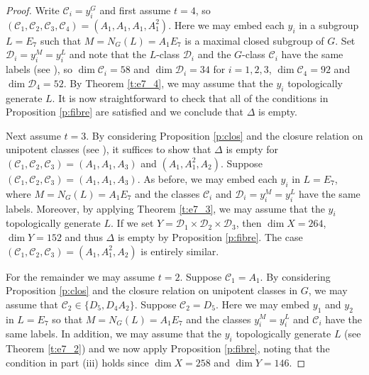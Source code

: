 \documentclass[twoside,a4paper,reqno,11pt]{amsart}
\newcommand{\<}{\langle}
\renewcommand{\>}{\rangle}
\renewcommand{\:}{\colon}
\theoremstyle{plain}
\theoremstyle{definition}
\begin{document}
\begin{proof}
Write $\mathcal{C}_i = y_i^G$ and first assume $t=4$, so $(\mathcal{C}_1, \mathcal{C}_2, \mathcal{C}_3, \mathcal{C}_4) = (A_1,A_1,A_1,A_1^2)$. Here we may embed each $y_i$ in a subgroup $L = E_7$ such that $M=N_G(L)=A_1E_7$ is a maximal closed subgroup of $G$. Set $\mathcal{D}_i = y_i^M = y_i^L$ and note that the $L$-class $\mathcal{D}_i$ and the $G$-class $\mathcal{C}_i$ have the same labels (see \cite[Section 4.14]{Law2}), so $\dim \mathcal{C}_i = 58$ and $\dim \mathcal{D}_i = 34$ for $i=1,2,3$, $\dim \mathcal{C}_4 = 92$ and $\dim \mathcal{D}_4 = 52$. By Theorem \ref{t:e7_4}, we may assume that the $y_i$ topologically generate $L$. It is now straightforward to check that all of the conditions in Proposition \ref{p:fibre} are satisfied and we conclude that $\Delta$ is empty.

Next assume $t=3$. By considering Proposition \ref{p:clos} and the closure relation on unipotent classes (see \cite{Spal}), it suffices to show that $\Delta$ is empty for $(\mathcal{C}_1,\mathcal{C}_2,\mathcal{C}_3) = (A_1,A_1,A_3)$ and $(A_1,A_1^2,A_2)$. Suppose $(\mathcal{C}_1,\mathcal{C}_2,\mathcal{C}_3) = (A_1,A_1,A_3)$. As before, we may embed each $y_i$ in $L = E_7$, where $M = N_G(L) = A_1E_7$ and the classes $\mathcal{C}_i$ and $\mathcal{D}_i = y_i^M = y_i^L$ have the same labels. Moreover, by applying Theorem \ref{t:e7_3}, we may assume that the $y_i$ topologically generate $L$. If we set $Y = \mathcal{D}_1 \times \mathcal{D}_2 \times \mathcal{D}_3$, then $\dim X = 264$, $\dim Y = 152$ and thus $\Delta$ is empty by Proposition \ref{p:fibre}. The case $(\mathcal{C}_1,\mathcal{C}_2,\mathcal{C}_3) = (A_1,A_1^2,A_2)$ is entirely similar.

For the remainder we may assume $t=2$. Suppose $\mathcal{C}_1 = A_1$. By considering Proposition \ref{p:clos} and the closure relation on unipotent classes in $G$, we may assume that $\mathcal{C}_2 \in \{ D_5, D_4A_2\}$. Suppose $\mathcal{C}_2 = D_5$. Here we may embed $y_1$ and $y_2$ in $L = E_7$ so that $M = N_G(L) = A_1E_7$ and the classes $y_i^M = y_i^L$ and $\mathcal{C}_i$ have the same labels. In addition, we may assume that the $y_i$ topologically generate $L$ (see Theorem \ref{t:e7_2}) and we now apply Proposition \ref{p:fibre}, noting that the condition in part (iii) holds since $\dim X = 258$ and $\dim Y = 146$. 


\end{proof}
\end{document}
